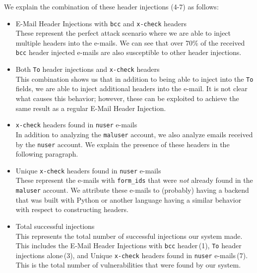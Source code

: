 
We explain the combination of these header injections (4-7) as follows:
\begin{itemize}
	\item E-Mail Header Injections with \texttt{bcc} and \texttt{x-check} headers\\
	These represent the perfect attack scenario where we are able to inject multiple headers into the e-mails. We can see that over 70\% of the received \texttt{bcc} header injected e-mails are also susceptible to other header injections.
	
	\item Both \texttt{To} header injections and \texttt{x-check} headers \\
	This combination shows us that in addition to being able to inject into the \texttt{To} fields, we are able to inject additional headers into the e-mail. It is not clear what causes this behavior; however, these can be exploited to achieve the same result as a regular E-Mail Header Injection.
	
	\item \texttt{x-check} headers found in \texttt{nuser} e-mails\\
	In addition to analyzing the \texttt{maluser} account, we also analyze emails received by the \texttt{nuser} account. We explain the presence of these headers in the following paragraph.

	\item Unique \texttt{x-check} headers found in \texttt{nuser} e-mails\\
	These represent the e-mails with \lstinline|form_ids| that were \emph{not} already found in the \texttt{maluser} account. We attribute these e-mails to (probably) having a backend that was built with Python or another language having a similar behavior with respect to constructing headers.
	
	\item Total successful injections\\
	This represents the total number of successful injections our system made. This includes the E-Mail Header Injections with \texttt{bcc} header\,(1), \texttt{To} header injections alone\,(3), and Unique \texttt{x-check} headers found in \texttt{nuser} e-mails\,(7). This is the total number of vulnerabilities that were found by our system.
	
\end{itemize}

